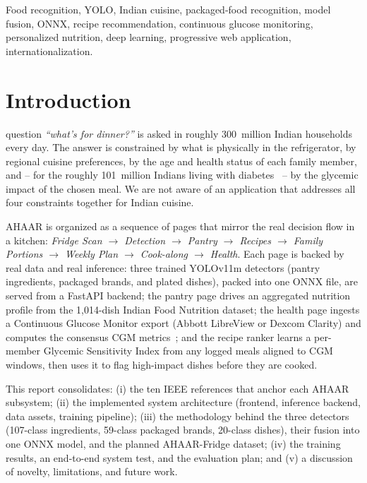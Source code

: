 \documentclass[journal]{IEEEtran}
\begin{document}
\begin{IEEEkeywords}
Food recognition, YOLO, Indian cuisine, packaged-food recognition,
model fusion, ONNX, recipe recommendation,
continuous glucose monitoring, personalized nutrition, deep learning,
progressive web application, internationalization.
\end{IEEEkeywords}

\section{Introduction}
 question \textit{``what's for dinner?''} is asked
in roughly 300~million Indian households every day. The answer is
constrained by what is physically in the refrigerator, by regional
cuisine preferences, by the age and health status of each family
member, and -- for the roughly 101~million Indians living with
diabetes~\cite{anjana2023icmr} -- by the glycemic impact of the chosen meal. We are
not aware of an application that addresses all four constraints
together for Indian cuisine.

AHAAR is organized as a sequence of pages that mirror the real
decision flow in a kitchen:
\textit{Fridge Scan $\rightarrow$ Detection $\rightarrow$ Pantry $\rightarrow$ Recipes $\rightarrow$ Family Portions $\rightarrow$ Weekly Plan $\rightarrow$ Cook-along $\rightarrow$ Health}.
Each page is backed by real data and real inference: three trained
YOLOv11m detectors (pantry ingredients, packaged brands, and plated
dishes), packed into one ONNX file, are served from a FastAPI backend;
the pantry page
drives an aggregated nutrition profile from the 1{,}014-dish Indian
Food Nutrition dataset; the health page ingests a Continuous Glucose
Monitor export (Abbott LibreView or Dexcom Clarity) and computes the
consensus CGM metrics~\cite{battelino2019tir}; and the recipe ranker learns a per-member
Glycemic Sensitivity Index from any logged meals aligned to CGM
windows, then uses it to flag high-impact dishes before they are cooked.

This report consolidates: (i) the ten IEEE references that anchor
each AHAAR subsystem; (ii) the implemented system architecture
(frontend, inference backend, data assets, training pipeline);
(iii) the methodology behind the three detectors (107-class
ingredients, 59-class packaged brands, 20-class dishes), their fusion
into one ONNX model, and the planned AHAAR-Fridge dataset; (iv) the
training results, an end-to-end system test, and the evaluation plan;
and (v) a discussion of novelty, limitations, and future work.
\end{document}

